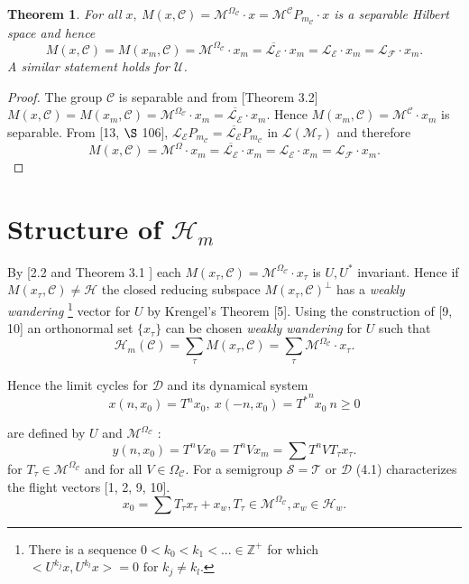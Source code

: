 \documentclass[req no]{amsart}[16pt]
\theoremstyle{plain}
\newtheorem{theorem}{Theorem}[section]
\theoremstyle{definition}
\numberwithin{equation}{section}\setcounter{page}{1}
\def\m{\mbox}
\def\D{\displaystyle}
\def\mo{\m{ or }}
\def\mf{\m{ for }}
\def\D{\mathcal{D}}
\def\h{\mathcal{H}}
\def\T {\mathcal{T}}
\def\L {\mathcal{L}}
\def\M {\mathcal{M}}
\def\s{\mathcal{S}}
\def\C{\mathcal{C}}
\def\U{\mathcal{U}}
\begin{document}
\begin{theorem}
For all $x, ~ M(x, \C)=\M^{\Omega_{\C}} \cdot x = \M^{\C}P_{m_{\C}} \cdot x$ is a separable Hilbert space and hence
$$M(x, \C)= M(x_{m}, \C)=\M^{\Omega_{\C}} \cdot x_{m}= \overline{\mathcal{L}_{\mathcal{E}}}\cdot x_{m} = \mathcal{L}_{\mathcal{E}}\cdot x_{m} = \mathcal{L}_{\mathcal{F}}\cdot x_{m}.$$
A similar statement holds for $\U$.
\end{theorem}
\begin{proof}
The group $\C $ is separable and from [Theorem 3.2]
$M(x, \C)=M(x_{m}, \C)=\M^{\Omega_{\C}} \cdot x_{m}=\overline{\mathcal{L}_{\mathcal{E}}} \cdot x_{m}.$
Hence $M(x_{m}, \C)=\M^{\C} \cdot x_{m}$ is separable. From [13, $\S$ 106], $\mathcal{L}_{\mathcal{E}}P_{m_{\C}}=\overline{\mathcal{L}_{\mathcal{E}}}P_{m_{\C}}$ in $\L(\M_{\tau})$ and therefore
$$M(x, \C)=\M^{\Omega} \cdot x_{m}= \overline{\mathcal{L}_{\mathcal{E}}} \cdot x_{m} = \mathcal{L}_{\mathcal{E}}\cdot x_{m}= \mathcal{L}_{\mathcal{F}}\cdot x_{m}.$$
\end{proof}




\section{Structure of $\h_{m}$}
  By [2.2 and Theorem 3.1 ] each $M(x_{\tau}, \C) = \mathcal{M}^{\Omega_{\C}} \cdot x_{\tau}$ is $U, U^{*}$ invariant. Hence if $M(x_{\tau}, \C) \neq \h$ the closed reducing subspace $M(x_{\tau}, \C)^{\perp}$ has a \emph{weakly wandering} \footnote{ There is a sequence $ 0 < k_{0}<k_{1}<... \in \mathbb{Z}^{+}$ for which $<U^{k_{j}} x, U^{k_{l}} x >=0 \mf k_{j}\neq k_{l}$.} vector for $U$ by Krengel's Theorem [5]. Using the construction of [9, 10] an orthonormal set $\{x_{\tau}\}$ can be chosen \emph{weakly wandering} for $U$ such that
  \begin{equation}\label{eqn6}
   \h_{m}(\C) = \sum_\tau M(x_{\tau}, \C) = \sum_\tau \M^{\Omega_{\C}} \cdot x_{\tau}.
 \end{equation}

 Hence the limit cycles for $\D$ and its dynamical system
 \begin{equation}\label{eqn7}
   x(n,x_{0}) = T^{n}x_{0}, ~x(-n,x_{0}) = {T^{*}}^{n}x_{0}~ n\geq 0
 \end{equation}

are defined by $U$ and $\M^{\Omega_{\C}}$ :
\begin{equation}\label{eqn8}
  y(n,x_{0}) = T^{n} V x_{0} =  T^{n} V x_{m} = \sum T^{n} V T_{\tau} x_{\tau}.
\end{equation}
  for $T_{\tau} \in \M^{\Omega_{\C}}$ and for all $ V \in \Omega_{\C}.$ For a semigroup $\s = \T \mo \D$ (4.1) characterizes the flight vectors [1, 2, 9, 10].
  \begin{equation}\label{eqn8}
    x_{0} = \sum T_{\tau} x_{\tau} + x_{w}, T_{\tau} \in \M^{\Omega_{\C}}, x_{w} \in \h_{w} .
  \end{equation}
\end{document}
